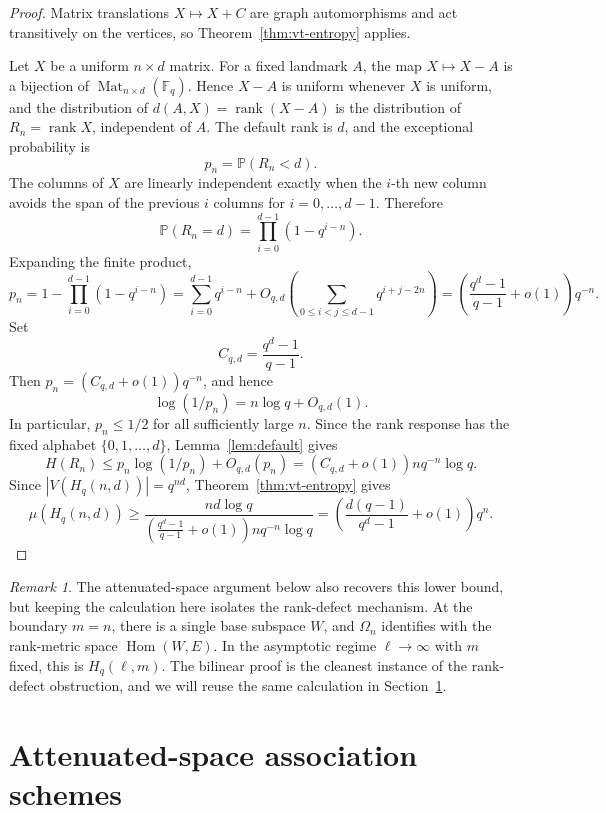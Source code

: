 \documentclass[11pt]{article}
\theoremstyle{definition}
\theoremstyle{remark}
\newtheorem{remark}[theorem]{Remark}
\newcommand{\F}{\mathbb F}
\newcommand{\Hom}{\operatorname{Hom}}
\newcommand{\Mat}{\operatorname{Mat}}
\newcommand{\rank}{\operatorname{rank}}
\newcommand{\Prob}{\mathbb P}
\begin{document}
\begin{proof}
Matrix translations \(X\mapsto X+C\) are graph automorphisms and act
transitively on the vertices, so Theorem~\ref{thm:vt-entropy} applies.

Let \(X\) be a uniform \(n\times d\) matrix.  For a fixed landmark \(A\), 
the map \(X\mapsto X-A\) is a bijection of \(\Mat_{n\times d}(\F_q)\).  
Hence \(X-A\) is uniform whenever \(X\) is uniform, and the distribution 
of \(d(A,X)=\rank(X-A)\) is the distribution of \(R_n=\rank X\), 
independent of \(A\).  The default rank is \(d\), and the exceptional 
probability is
\[
        p_n=\Prob(R_n<d).
\]
The columns of \(X\) are linearly independent exactly when the \(i\)-th 
new column avoids the span of the previous \(i\) columns for 
\(i=0,\ldots,d-1\).  Therefore
\[
        \Prob(R_n=d)=\prod_{i=0}^{d-1}(1-q^{i-n}).
\]
Expanding the finite product,
\[
        p_n
        =
        1-\prod_{i=0}^{d-1}(1-q^{i-n})
        =
        \sum_{i=0}^{d-1}q^{i-n}+O_{q,d}\left(\sum_{0\leq i<j\leq 
d-1}q^{i+j-2n}\right)
        =
        \left(\frac{q^d-1}{q-1}+o(1)\right)q^{-n}.
\]
Set
\[
        C_{q,d}=\frac{q^d-1}{q-1}.
\]
Then \(p_n=(C_{q,d}+o(1))q^{-n}\), and hence
\[
        \log(1/p_n)=n\log q+O_{q,d}(1).
\]
In particular, \(p_n\leq1/2\) for all sufficiently large \(n\).
Since the rank response has the fixed alphabet \(\{0,1,\ldots,d\}\), 
Lemma~\ref{lem:default} gives
\[
        H(R_n)
        \leq
        p_n\log(1/p_n)+O_{q,d}(p_n)
        =
        (C_{q,d}+o(1))nq^{-n}\log q.
\]
Since \(|V(H_q(n,d))|=q^{nd}\), Theorem~\ref{thm:vt-entropy} gives
\[
        \mu(H_q(n,d))
        \geq
        \frac{nd\log q}
        {\left(\frac{q^d-1}{q-1}+o(1)\right)nq^{-n}\log q}
        =
        \left(\frac{d(q-1)}{q^d-1}+o(1)\right)q^n.
\]
\end{proof}

\begin{remark}
The attenuated-space argument below also recovers this lower bound, but
keeping the calculation here isolates the rank-defect mechanism.  At the
boundary \(m=n\), there is a single base
subspace \(W\), and \(\Omega_n\) identifies with the rank-metric space
\(\Hom(W,E)\).  In the asymptotic regime \(\ell\to\infty\) with \(m\)
fixed, this is \(H_q(\ell,m)\).  The bilinear proof is the cleanest instance
of the rank-defect 
obstruction, and we will reuse the same calculation in
Section~\ref{sec:attenuated}.
\end{remark}

\section{Attenuated-space association schemes}\label{sec:attenuated}
\end{document}
